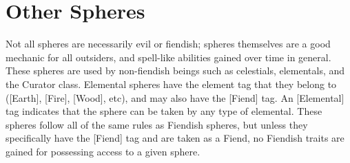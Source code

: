 \section{Other Spheres}

Not all spheres are necessarily evil or fiendish; spheres themselves are a good mechanic for all outsiders, and spell-like abilities gained over time in general. These spheres are used by non-fiendish beings such as celestials, elementals, and the Curator class. Elemental spheres have the element tag that they belong to ([Earth], [Fire], [Wood], etc), and may also have the [Fiend] tag. An [Elemental] tag indicates that the sphere can be taken by any type of elemental. These spheres follow all of the same rules as Fiendish spheres, but unless they specifically have the [Fiend] tag and are taken as a Fiend, no Fiendish traits are gained for possessing access to a given sphere.


